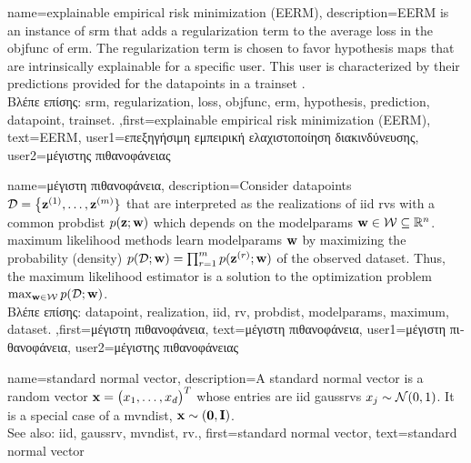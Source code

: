 {name={explainable empirical risk minimization (EERM)}, 
	description={EERM is an 
		instance of \gls{srm} that adds a \gls{regularization} term to the 
		average \gls{loss} in the \gls{objfunc} of \gls{erm}. 
		The \gls{regularization} term is chosen to favor \gls{hypothesis} maps that are intrinsically 
		explainable for a specific user. This user is characterized by their \gls{prediction}s provided 
		for the \gls{datapoint}s in a \gls{trainset} \cite{Zhang:2024aa}.\\
		\foreignlanguage{greek}{Βλέπε επίσης:} \gls{srm}, \gls{regularization}, \gls{loss}, \gls{objfunc}, \gls{erm}, \gls{hypothesis}, \gls{prediction}, \gls{datapoint}, \gls{trainset}.
		},first={explainable empirical risk minimization (EERM)}, 
		text={EERM},
		user1={\foreignlanguage{greek}{επεξηγήσιμη εμπειρική ελαχιστοποίηση διακινδύνευσης}}, %
  		user2={\foreignlanguage{greek}{μέγιστης πιθανοφάνειας}} %
}


	


{name={\foreignlanguage{greek}{μέγιστη πιθανοφάνεια}}, 
	description={Consider \gls{datapoint}s $\mathcal{D}=\big\{ {\bf z}^{(1)}, \ldots, {\bf z}^{(m)} \}$ 
		that are interpreted as the \gls{realization}s of \gls{iid} \gls{rv}s with a common \gls{probdist} $p({{\bf z}; {\bf w}})$ which 
		depends on the \gls{modelparams} ${\bf w} \in \mathcal{W} \subseteq \mathbb{R}^{n}$. 
		\Gls{maximum} likelihood methods learn \gls{modelparams} ${\bf w}$ by maximizing 
		the probability (density) $p({\mathcal{D}; {\bf w}}) = \prod_{r=1}^{m} p({{\bf z}^{(r)}; {\bf w}})$ 
		of the observed \gls{dataset}. Thus, the \gls{maximum} likelihood estimator is a 
		solution to the optimization problem $\max_{{\bf w} \in \mathcal{W}} p({\mathcal{D}; {\bf w}})$.\\
		\foreignlanguage{greek}{Βλέπε επίσης:} \gls{datapoint}, \gls{realization}, \gls{iid}, \gls{rv}, \gls{probdist}, \gls{modelparams}, \gls{maximum}, \gls{dataset}.
	},first={\foreignlanguage{greek}{μέγιστη πιθανοφάνεια}},
	text={\foreignlanguage{greek}{μέγιστη πιθανοφάνεια}},
	user1={\foreignlanguage{greek}{μέγιστη πιθανοφάνεια}}, %
  	user2={\foreignlanguage{greek}{μέγιστης πιθανοφά\-νει\-ας}} %
}


{name={standard normal vector}, 
	description={A standard normal vector is a random vector ${\bf x}=\big(x_{1},\ldots,x_{d}\big)^{T}$ 
		whose entries are \gls{iid} \gls{gaussrv}s $x_{j} \sim \mathcal{N}(0,1)$. 
		It is a special case of a \gls{mvndist}, ${\bf x} \sim \mathcal(\mathbf{0},\mathbf{I})$.
		\\ 
		See also: \gls{iid}, \gls{gaussrv}, \gls{mvndist}, \gls{rv}.}, 
	first={standard normal vector},
	text={standard normal vector}
}





